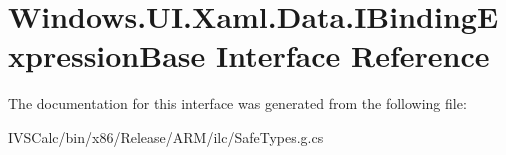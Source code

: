 \hypertarget{interface_windows_1_1_u_i_1_1_xaml_1_1_data_1_1_i_binding_expression_base}{}\section{Windows.\+U\+I.\+Xaml.\+Data.\+I\+Binding\+Expression\+Base Interface Reference}
\label{interface_windows_1_1_u_i_1_1_xaml_1_1_data_1_1_i_binding_expression_base}


The documentation for this interface was generated from the following file\+:\begin{DoxyCompactItemize}
\item 
I\+V\+S\+Calc/bin/x86/\+Release/\+A\+R\+M/ilc/Safe\+Types.\+g.\+cs\end{DoxyCompactItemize}
